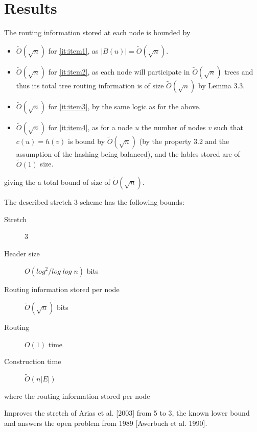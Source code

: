 \section{Results}
The routing information stored at each node is bounded by
\begin{itemize}
    \item $\tilde{O}(\sqrt{n})$ for \ref{it:item1}, as $|B(u)| = \tilde{O}(\sqrt{n})$.
    \item $\tilde{O}(\sqrt{n})$ for \ref{it:item2}, as each node will participate in $\tilde{O}(\sqrt{n})$ trees and thus its total tree routing information is of size $\tilde{O}(\sqrt{n})$ by Lemma 3.3.
    \item $\tilde{O}(\sqrt{n})$ for \ref{it:item3}, by the same logic as for the above.
    \item $\tilde{O}(\sqrt{n})$ for \ref{it:item4}, as for a node $u$ the number of nodes $v$ such that $c(u) = h(v)$ is bound by $\tilde{O}(\sqrt{n})$ (by the property 3.2 and the assumption of the hashing being balanced), and the lables stored are of $\tilde{O}(1)$ size.
\end{itemize}
giving the a total bound of size of $\tilde{O}(\sqrt{n})$.

The described stretch 3 scheme has the following bounds:
\begin{description}
    \item[Stretch] 3
    \item[Header size] $O(log^2/log\;log\;n)$ bits
    \item[Routing information stored per node] $\tilde{O}(\sqrt{n})$ bits
    \item[Routing] $O(1)$ time
    \item[Construction time] $\tilde{O}(n|E|)$
\end{description}
where the routing information stored per node 

Improves the stretch of Arias et al. [2003] from 5 to 3, the known lower bound and answers the open problem from 1989 [Awerbuch et al. 1990].

